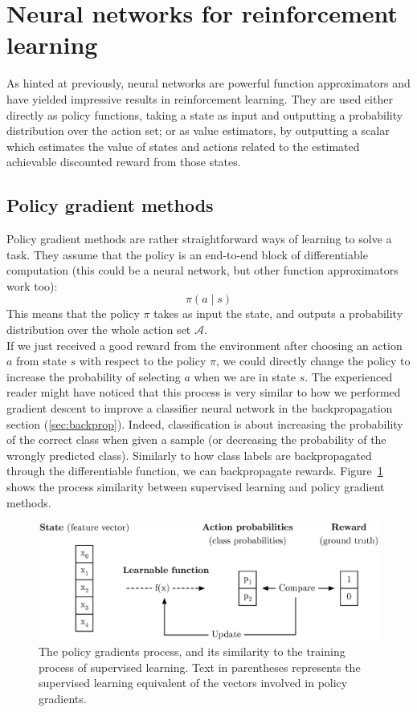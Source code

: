 \section{Neural networks for reinforcement learning}
As hinted at previously, neural networks are powerful function approximators and
have yielded impressive results in reinforcement learning. They are used either
directly as policy functions, taking a state as input and outputting a
probability distribution over the action set; or as value estimators, by 
outputting a scalar which estimates the value of states and actions related to the
estimated achievable discounted reward from those states.

\subsection{Policy gradient methods}
Policy gradient methods are rather straightforward ways of learning to solve a task.
They assume that the policy is an end-to-end block of differentiable computation
(this could be a neural network, but other function approximators work too):
$$\pi(a \mid s)$$
This means that the policy $\pi$ takes as input the state, and outputs a 
probability distribution over the whole action set $\mathcal{A}$.\\

If we just received a good reward from the environment after choosing an action
$a$ from state $s$
with respect to the policy $\pi$, we could directly change the policy to 
increase the probability of selecting $a$ when we are in state $s$. The
experienced reader might have noticed that this process is very similar to
how we performed gradient descent to improve a classifier neural network in
the backpropagation section (\ref{sec:backprop}).
Indeed, classification is about increasing the probability of the correct
class when given a sample (or decreasing the probability of the wrongly
predicted class). Similarly to how class labels are backpropagated through
the differentiable function, we can backpropagate rewards.
Figure~\ref{fig:supervised_vs_pg} shows the process similarity between 
supervised learning and policy gradient methods.\\


\begin{figure}
	\centering
	\includegraphics[width=0.8\linewidth]{fig/supervised_vs_pg.eps}
	\caption{The policy gradients process, and its similarity to
	the training process of supervised learning. Text in parentheses
	represents the supervised learning equivalent of the vectors 
	involved in policy gradients.}
	\label{fig:supervised_vs_pg}
\end{figure}

